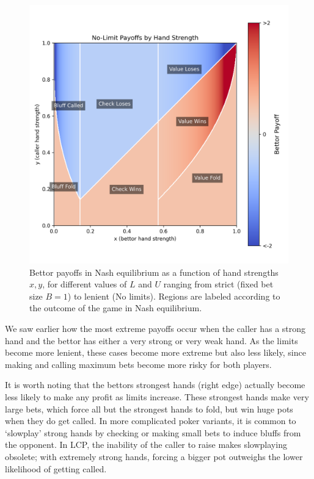 \documentclass[a4paper,12pt]{article}
\theoremstyle{plain}
\theoremstyle{definition}
\begin{document}
\begin{figure}[h!]
\begin{adjustwidth}{-1in}{-1in}
\begin{minipage}{0.4\textwidth}
        \end{minipage}
        \hspace{0.02\textwidth}
        \begin{minipage}{0.4\textwidth}
            \centering
            \includegraphics[width=\textwidth]{payoff_heatmap_with_regions_labeled.png}
        \end{minipage}
    \end{adjustwidth}
    \caption{Bettor payoffs in Nash equilibrium as a function of hand strengths $x, y$, for different values of $L$ and $U$ ranging from strict (fixed bet size $B=1$) to lenient (No limits). Regions are labeled according to the outcome of the game in Nash equilibrium.}
    \label{fig:payoffs}
\end{figure}

We saw earlier how the most extreme payoffs occur when the caller has a strong hand and the bettor has either a very strong or very weak hand. As the limits become more lenient, these cases become more extreme but also less likely, since making and calling maximum bets become more risky for both players. 

It is worth noting that the bettors strongest hands (right edge) actually become less likely to make any profit as limits increase. These strongest hands make very large bets, which force all but the strongest hands to fold, but win huge pots when they do get called. In more complicated poker variants, it is common to `slowplay' strong hands by checking or making small bets to induce bluffs from the opponent. In LCP, the inability of the caller to raise makes slowplaying obsolete; with extremely strong hands, forcing a bigger pot outweighs the lower likelihood of getting called.
\end{document}
